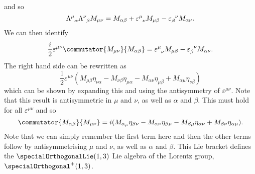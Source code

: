 \documentclass[fleqn]{NotesClass}
\newcommand{\minkowskiMetric}{\eta}
\begin{document}
    and so
    \begin{equation}
        \tensor{\Lambda}{^\mu_\alpha}\tensor{\Lambda}{^\nu_\beta}M_{\mu\nu} = M_{\alpha\beta} + \tensor{\varepsilon}{^\mu_\nu} M_{\mu\beta} - \tensor{\varepsilon}{_\beta^\nu}M_{\alpha\nu}.
    \end{equation}
    We can then identify
    \begin{equation}
        \frac{i}{2}\varepsilon^{\mu\nu}\commutator{M_{\mu\nu}}{M_{\alpha\beta}} = \tensor{\varepsilon}{^\mu_\nu} M_{\mu\beta} - \tensor{\varepsilon}{_\beta^\nu}M_{\alpha\nu}.
    \end{equation}
    The right hand side can be rewritten as
    \begin{equation}
        \frac{1}{2}\varepsilon^{\mu\nu}(M_{\mu\beta} \minkowskiMetric_{\nu\alpha} - M_{\nu\beta}\minkowskiMetric_{\mu\alpha} - M_{\alpha\nu}\minkowskiMetric_{\mu\beta} + M_{\alpha\mu}\minkowskiMetric_{\nu\beta})
    \end{equation}
    which can be shown by expanding this and using the antisymmetry of \(\varepsilon^{\mu\nu}\).
    Note that this result is antisymmetric in \(\mu\) and \(\nu\), as well as \(\alpha\) and \(\beta\).
    This must hold for all \(\varepsilon^{\mu\nu}\) and so
    \begin{equation}
        \commutator{M_{\alpha\beta}}{M_{\mu\nu}} = i(M_{\alpha_\mu} \minkowskiMetric_{\beta\nu} - M_{\alpha\nu} \minkowskiMetric_{\beta\mu} - M_{\beta\mu} \minkowskiMetric_{\alpha\nu} + M_{\beta\nu} \minkowskiMetric_{\alpha\mu}).
    \end{equation}
    Note that we can simply remember the first term here and then the other terms follow by antisymmetrising \(\mu\) and \(\nu\), as well as \(\alpha\) and \(\beta\).
    This Lie bracket defines the \(\specialOrthogonalLie(1, 3)\) Lie algebra of the Lorentz group, \(\specialOrthogonal^+(1, 3)\).
    
\end{document}

